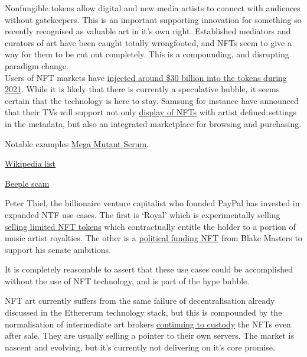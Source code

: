 Nonfungible tokens allow digital and new media artists to connect with audiences without gatekeepers. This is an important supporting innovation for something so recently recognised as valuable art in it's own right. Established mediators and curators of art have been caught totally wrongfooted, and NFTs seem to give a way for them to be cut out completely. This is a compounding, and disrupting paradigm change.\\

Users of NFT markets have \href{https://blog.chainalysis.com/reports/nft-market-report-preview-2021/}{injected around \$30 billion into the tokens during 2021}. While it is likely that there is currently a speculative bubble, it seems certain that the technology is here to stay. Samsung for instance have announced that their TVs will support not only \href{https://news.samsung.com/us/samsung-2022-micro-led-neo-qled-lifestyle-tvs-personalization-options-ces-2022/}{display of NFTs} with artist defined settings in the metadata, but also an integrated marketplace for browsing and purchasing.

Notable examples
\href{https://opensea.io/assets/0x22c36bfdcef207f9c0cc941936eff94d4246d14a/69}{Mega Mutant Serum}.

\href{https://en.wikipedia.org/wiki/List_of_most_expensive_non-fungible_tokens}{Wikipedia list}

\href{https://amycastor.com/2021/03/14/metakovan-the-mystery-beeple-art-buyer-and-his-nft-defi-scheme/}{Beeple scam}


Peter Thiel, the billionaire venture capitalist who founded PayPal has invested in expanded NTF use cases. The first is `Royal' which is experimentally  selling \href{https://royal.io/}{selling limited NFT tokens} which contractually entitle the holder to a portion of music artist royalties. The other is a \href{https://www.ztonft.com/}{political funding NFT} from Blake Masters to support his senate ambitions.

It is completely reasonable to assert that these use cases could be accomplished without the use of NFT technology, and is part of the hype bubble.

NFT art currently suffers from the same failure of decentralisation already discussed in the Ethererum technology stack, but this is compounded by the normalisation of intermediate art brokers \href{https://moxie.org/2022/01/07/web3-first-impressions.html}{continuing to custody} the NFTs even after sale. They are usually selling a pointer to their own servers. The market is nascent and evolving, but it's currently not delivering on it's core promise.

